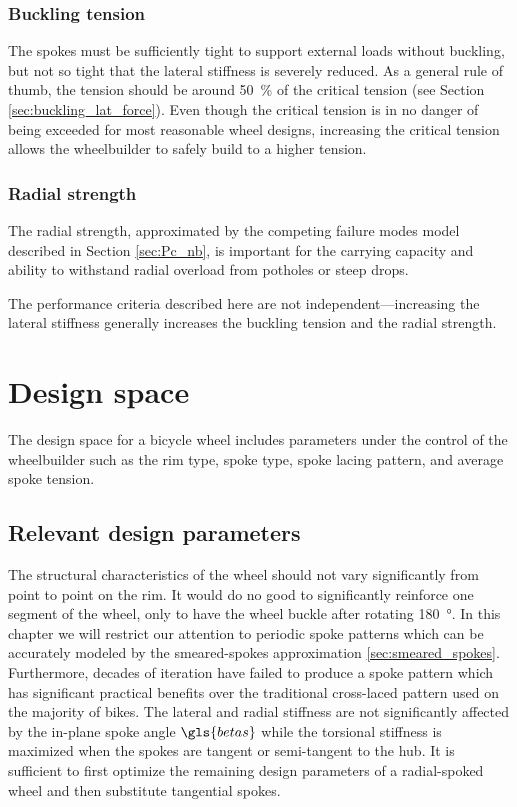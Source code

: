 \documentclass[\rootdir/thesis.tex]{subfiles}
\begin{document}
\subsubsection*{Buckling tension}
The spokes must be sufficiently tight to support external loads without buckling, but not so tight that the lateral stiffness is severely reduced. As a general rule of thumb, the tension should be around \SI{50}{\percent} of the critical tension (see Section \ref{sec:buckling_lat_force}). Even though the critical tension is in no danger of being exceeded for most reasonable wheel designs, increasing the critical tension allows the wheelbuilder to safely build to a higher tension.

\subsubsection*{Radial strength}
The radial strength, approximated by the competing failure modes model described in Section \ref{sec:Pc_nb}, is important for the carrying capacity and ability to withstand radial overload from potholes or steep drops.

The performance criteria described here are not independent---increasing the lateral stiffness generally increases the buckling tension and the radial strength.


\section{Design space}

The design space for a bicycle wheel includes parameters under the control of the wheelbuilder such as the rim type, spoke type, spoke lacing pattern, and average spoke tension.

\subsection{Relevant design parameters}


The structural characteristics of the wheel should not vary significantly from point to point on the rim. It would do no good to significantly reinforce one segment of the wheel, only to have the wheel buckle after rotating \SI{180}{\degree}. In this chapter we will restrict our attention to periodic spoke patterns which can be accurately modeled by the smeared-spokes approximation \ref{sec:smeared_spokes}. Furthermore, decades of iteration have failed to produce a spoke pattern which has significant practical benefits over the traditional cross-laced pattern used on the majority of bikes. The lateral and radial stiffness are not significantly affected by the in-plane spoke angle $\gls{betas}$ while the torsional stiffness is maximized when the spokes are tangent or semi-tangent to the hub. It is sufficient to first optimize the remaining design parameters of a radial-spoked wheel and then substitute tangential spokes.
\end{document}
